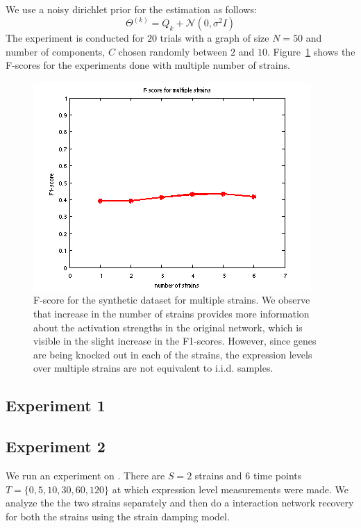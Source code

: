 \documentclass{bioinfo}
\begin{document}
We use a noisy dirichlet prior for the estimation as follows: 
\begin{equation}
  \label{eq:exp1_prior}
\Theta^{(k)}  = Q_{k} + {\mathcal N}(0, \sigma^{2} I)   
\end{equation}
The experiment is conducted for $20$ trials with a graph of size
$N=50$ and number of components, $C$ chosen randomly between $2$ and
$10$. Figure~\ref{fig:exp1_fig} shows the F-scores for the
experiments done with multiple number of strains. 
 \begin{figure}[h]
   \centering
     \includegraphics[scale=0.75]{results/Fig1_2}
   \caption{F-score for the synthetic dataset for multiple strains. We
     observe that increase in the number of strains provides more
     information about the activation strengths in the original
     network, which is visible in the slight increase in the
     F1-scores. However, since genes are being knocked out in each of
     the strains, the expression levels over multiple strains  are not equivalent to i.i.d. samples.  
   }
   \label{fig:exp1_fig}
 \end{figure}
\subsection{Experiment 1}
\label{sec:experiment-1}

\subsection{Experiment 2}
\label{sec:experiment-2}
We run an experiment on .  There are $S=2$
strains and $6$ time points $T=\{0, 5, 10, 30, 60, 120\}$ at which
expression level measurements were made. We analyze the the two
strains separately and then do a interaction network recovery for both
the strains using the strain damping model.
\end{document}
